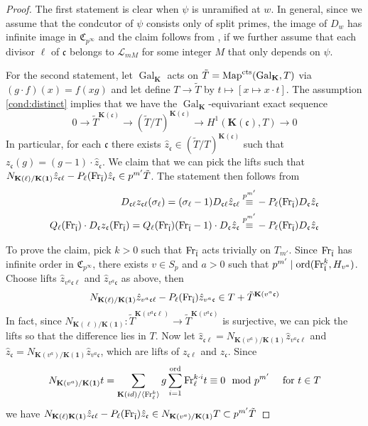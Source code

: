 \documentclass[leqno]{amsart}
\newcommand{\flw}{\bar{\fl}}
\newcommand{\Fr}{\textnormal{Fr}} %
\DeclareMathOperator{\Gal}{Gal}
\newcommand{\cts}{\textnormal{cts}}
\newcommand{\ord}{\textnormal{ord}}
\newcommand{\id}{\mathbf{1}}
\newcommand{\K}{{\mathbf{K}}} %
\newcommand{\rp}[1]{\mathfrak{C}_{#1}} %
\newcommand{\rs}[1]{H_{#1}} %
\newcommand{\rk}[1]{\K({#1})} %
\newcommand{\fc}{\mathfrak{c}}
\newcommand{\fl}{\mathfrak{l}}
\theoremstyle{definition}
\theoremstyle{remark}
\begin{document}
\begin{proof}
The first statement is clear when 
$\psi$ is unramified at $w$.
In general, since we assume
that the condcutor of $\psi$ consists
only of split primes, the 
image of $D_w$ has infinite image in  $\rp{p^\infty}$
and the claim follows from
\cite[Cor 4.6.5]{Rubin},
if we further assume that
each divisor $\ell$ of $\fc$
belongs to  $\mathcal{L}_{mM}$ 
for some integer $M$ that only depends on  $\psi$.

For the second statement, 
let $\Gal_\K$ acts on $\tilde{T}=\text{Map}^{\cts}(\Gal_\K,T)$
via $(g\cdot f)(x)=f(xg)$ and 
let define $T\to\tilde{T}$ by
$t\mapsto [x\mapsto x\cdot t]$.
The assumption \eqref{cond:distinct} implies that
we have the $\Gal_\K$-equivariant 
exact sequence
\[
	0\to\tilde{T}^{\rk{\fc}}\to (\tilde{T}/T)^{\rk{\fc}}\to 
	H^1(\rk{\fc},T)\to 0
\]
In particular, for each $\fc$
there exists $ \hat{z}_\fc\in (\tilde{T}/T)^{\rk{\fc}}$
such that $z_\fc(g)=(g-1)\cdot \hat{z}_\fc$.
We claim that we can pick the lifts such that
$N_{\rk{\ell}/\rk{\id}}\hat{z}_{\fc\ell}-P_\ell(\Fr_{\flw})
\hat{z}_{\fc}\in p^{m'}\tilde{T}$.
The statement then follows from 
\begin{align*}
	D_{\fc\ell}z_{\fc\ell}(\sigma_\ell)=
	(\sigma_\ell-1)D_{\fc\ell}\hat{z}_{\fc\ell}
	\overset{p^{m'}}{\equiv}&
	-P_\ell(\Fr_{\flw}) D_\fc \hat{z}_\fc\\
	Q_\ell(\Fr_{\flw})\cdot
	D_\fc z_\fc(\Fr_{\flw})=
	Q_\ell(\Fr_{\flw})(\Fr_{\flw}-1)
	\cdot D_\fc \hat{z}_\fc
	\overset{p^{m'}}{\equiv}&
	-P_\ell(\Fr_{\flw}) D_\fc \hat{z}_\fc
\end{align*}

To prove the claim,
pick $k>0$ such that 
$\Fr_{\flw}$ acts trivially on $T_{m'}$.
Since $\Fr_{\flw}$ has infinite order
in $\rp{p^\infty}$,
there exists  $v\in S_p$ and  $a>0$
such that
$p^{m'}\mid \ord(\Fr_{\flw}^k, \rs{v^a})$.
Choose lifts
$\hat{z}_{v^a\fc\ell}$ and $ \hat{z}_{v^a\fc}$
as above, then
\[
	N_{\rk{\ell}/\rk{\id}}
	\hat{z}_{v^a\fc\ell}-P_\ell(\Fr_{\flw})
	\hat{z}_{v^a\fc}\in T+\tilde{T}^{\rk{v^a\fc}}
\]
In fact, since 
$N_{\rk{\ell}/\rk{\id}}\colon\tilde{T}^{\rk{v^a\fc\ell}}\to
\tilde{T}^{\rk{v^a\fc}}$ 
is surjective,
we can pick the lifts so that the difference
lies in $T$.
Now let 
$\hat{z}_{\fc\ell}=N_{\rk{v^a}/\rk{\id}}
\hat{z}_{v^a\fc\ell}$ and
$\hat{z}_{\fc}=N_{\rk{v^a}/\rk{\id}}\hat{z}_{v^a\fc}$,
which are lifts of $z_{\fc\ell}$ and $z_{\fc}$.
Since
\[
	N_{\rk{v^a}/\rk{\id}}t=
	\sum_{\rk{id}/\langle \Fr_\ell^k\rangle}g
	\sum_{i=1}^{\ord}\Fr_\ell^{k\cdot i} t\equiv 0
	\mod p^{m'}\quad
	\text{ for } t\in T
\]
we have 
$N_{\rk{\ell}\rk{\id}}\hat{z}_{\fc\ell}-P_\ell(\Fr_{\flw})
\hat{z}_{\fc}\in N_{\rk{v^a}/\rk{\id}}T\subset p^{m'}\tilde{T}$
\end{proof}
\end{document}
